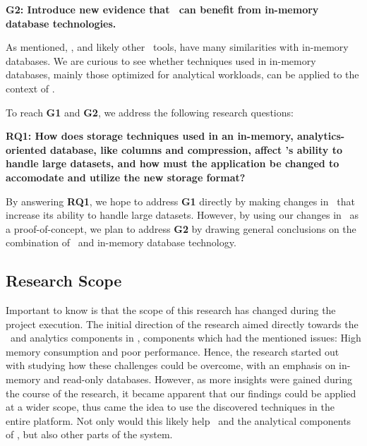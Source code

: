 \setlength{\leftskip}{1cm}

\textbf{G2: Introduce new evidence that \mde~can benefit from in-memory database technologies.}

\setlength{\leftskip}{0pt}

As mentioned, \gap, and likely other \mde~tools, have many similarities with in-memory databases. We are curious to see whether techniques used in in-memory databases, mainly those optimized for analytical workloads, can be applied to the context of \mde. 

To reach \textbf{G1} and \textbf{G2}, we address the following research questions:

\setlength{\leftskip}{1cm}

\textbf{RQ1: How does storage techniques used in an in-memory, analytics-oriented database, like columns and compression, affect \gap's ability to handle large datasets, and how must the application be changed to accomodate and utilize the new storage format?} 

\setlength{\leftskip}{0pt}

By answering \textbf{RQ1}, we hope to address \textbf{G1} directly by making changes in \gap~that increase its ability to handle large datasets. However, by using our changes in \gap~as a proof-of-concept, we plan to address \textbf{G2} by drawing general conclusions on the combination of \mde~and in-memory database technology.

\subsection{Research Scope}
\label{sub:Research Scope}
Important to know is that the scope of this research has changed during the project execution. The initial direction of the research aimed directly towards the \bi~and analytics components in \gap, components which had the mentioned issues: High memory consumption and poor performance. Hence, the research started out with studying how these challenges could be overcome, with an emphasis on in-memory and read-only databases. However, as more insights were gained during the course of the research, it became apparent that our findings could be applied at a wider scope, thus came the idea to use the discovered techniques in the entire platform. Not only would this likely help \bi~and the analytical components of \gap, but also other parts of the system.

